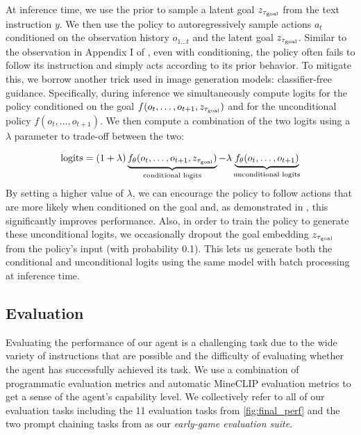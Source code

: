 At inference time, we use the prior to sample a latent goal $z_{\tau_{\text{goal}}}$ from the text instruction $y$. We then use the policy to autoregressively sample actions $a_t$ conditioned on the observation history $o_{1\ldots t}$ and the latent goal $z_{\tau_{\text{goal}}}$. Similar to the observation in Appendix I of \citet{baker2022vpt}, even with conditioning, the policy often fails to follow its instruction and simply acts according to its prior behavior. To mitigate this, we borrow another trick used in image generation models: classifier-free guidance. Specifically, during inference we simultaneously compute logits for the policy conditioned on the goal $f(o_t, \ldots, o_{t+1}, z_{\tau_{\text{goal}}})$ and for the unconditional policy $f(o_t, \ldots, o_{t+1})$. We then compute a combination of the two logits using a $\lambda$ parameter to trade-off between the two:

\bigskip
\begin{equation}
    \operatorname{logits} = (1 + \lambda) \underbrace{f_{\theta}(o_t, \ldots, o_{t+1}, z_{\tau_{\text{goal}}})}_{\text{conditional logits}} - \lambda \underbrace{f_{\theta}(o_t, \ldots, o_{t+1})}_{\text{unconditional logits}}
\end{equation}
By setting a higher value of $\lambda$, we can encourage the policy to follow actions that are more likely when conditioned on the goal and, as demonstrated in , this significantly improves performance. Also, in order to train the policy to generate these unconditional logits, we occasionally dropout the goal embedding $z_{\tau_{\text{goal}}}$ from the policy's input (with probability 0.1). This lets us generate both the conditional and unconditional logits using the same model with batch processing at inference time.

\subsection{Evaluation}

Evaluating the performance of our agent is a challenging task due to the wide variety of instructions that are possible and the difficulty of evaluating whether the agent has successfully achieved its task. We use a combination of programmatic evaluation metrics and automatic MineCLIP evaluation metrics to get a sense of the agent's capability level. We collectively refer to all of our evaluation tasks including the 11 evaluation tasks from \autoref{fig:final_perf} and the two prompt chaining tasks from  as our \textit{early-game evaluation suite}.

